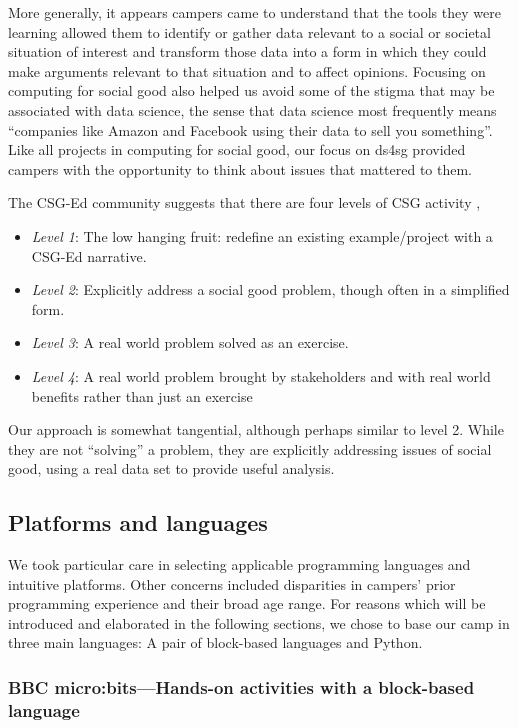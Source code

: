 More generally, it appears campers came to understand that the
tools they were learning allowed them to identify or gather data
relevant to a social or societal situation of interest and transform
those data into a form in which they could make arguments relevant
to that situation and to affect opinions.  Focusing on computing
for social good also helped us avoid some of the stigma that may
be associated with data science, the sense that data science most
frequently means ``companies like Amazon and Facebook using their
data to sell you something''.  Like all projects in computing for
social good, our focus on ds4sg provided campers with the opportunity
to think about issues that mattered to them.

The CSG-Ed community suggests that there are four levels of CSG
activity \cite{Goldweber2018},

\begin{itemize}
\item \textit{Level 1}: The low hanging fruit: redefine an existing
  example/project with a CSG-Ed narrative.
\item \textit{Level 2}: Explicitly address a social good problem,
  though often in a simplified form.
\item \textit{Level 3}: A real world problem solved as an
  exercise.
\item \textit{Level 4}: A real world problem brought by stakeholders
  and with real world benefits rather than just an exercise
\end{itemize}

\noindent
Our approach is somewhat tangential, although perhaps similar to
level 2.  While they are not ``solving'' a problem, they are
explicitly addressing issues of social good, using a real data set
to provide useful analysis.



\subsection{Platforms and languages}

We took particular care in selecting applicable programming languages
and intuitive platforms. Other concerns 
included disparities in campers' prior programming experience and
their broad age range. For reasons which will be introduced and
elaborated in the following sections, we chose to base our camp in
three main languages: A pair of block-based languages and Python.

\subsubsection{BBC micro:bits---Hands-on activities with a block-based language}

